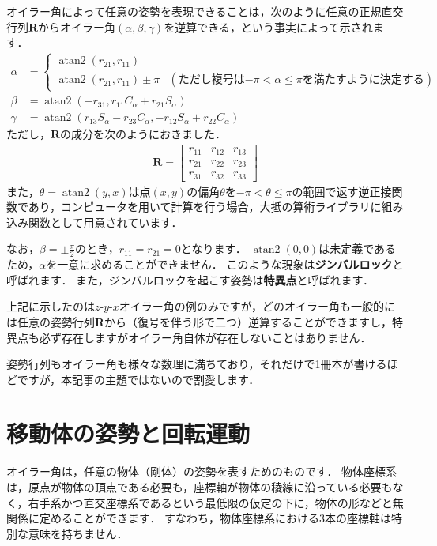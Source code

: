 ﻿\documentclass[a4paper]{jsarticle}
\begin{document}
オイラー角によって任意の姿勢を表現できることは，次のように任意の正規直交行列$\boldsymbol{R}$からオイラー角$(\alpha,\beta,\gamma)$を逆算できる，という事実によって示されます．
\begin{align*}
\alpha&=\begin{cases}
\mathop{\mathrm{atan2}}(r_{21},r_{11}) & \\
\mathop{\mathrm{atan2}}(r_{21},r_{11})\pm\pi & (\mbox{ただし複号は$-\pi<\alpha\leq\pi$を満たすように決定する})
\end{cases} \\
\beta&=\mathop{\mathrm{atan2}}(-r_{31},r_{11}C_{\alpha}+r_{21}S_{\alpha}) \\
\gamma&=\mathop{\mathrm{atan2}}(r_{13}S_{\alpha}-r_{23}C_{\alpha},-r_{12}S_{\alpha}+r_{22}C_{\alpha})
\end{align*}
ただし，$\boldsymbol{R}$の成分を次のようにおきました．
\begin{align*}
\boldsymbol{R}=\begin{bmatrix}
 r_{11} & r_{12} & r_{13} \\
 r_{21} & r_{22} & r_{23} \\
 r_{31} & r_{32} & r_{33}
\end{bmatrix}
\end{align*}
また，$\theta=\mathop{\mathrm{atan2}}(y,x)$は点$(x,y)$の偏角$\theta$を$-\pi<\theta\leq\pi$の範囲で返す逆正接関数であり，コンピュータを用いて計算を行う場合，大抵の算術ライブラリに組み込み関数として用意されています．

なお，$\beta=\pm\frac{\pi}{2}$のとき，$r_{11}=r_{21}=0$となります．
$\mathop{\mathrm{atan2}}(0,0)$は未定義であるため，$\alpha$を一意に求めることができません．
このような現象は{\bf ジンバルロック}と呼ばれます．
また，ジンバルロックを起こす姿勢は{\bf 特異点}と呼ばれます．

上記に示したのは$z$-$y$-$x$オイラー角の例のみですが，どのオイラー角も一般的には任意の姿勢行列$\boldsymbol{R}$から（復号を伴う形で二つ）逆算することができますし，特異点も必ず存在しますがオイラー角自体が存在しないことはありません．

姿勢行列もオイラー角も様々な数理に満ちており，それだけで1冊本が書けるほどですが，本記事の主題ではないので割愛します．



\section{移動体の姿勢と回転運動}

オイラー角は，任意の物体（剛体）の姿勢を表すためのものです．
物体座標系は，原点が物体の頂点である必要も，座標軸が物体の稜線に沿っている必要もなく，右手系かつ直交座標系であるという最低限の仮定の下に，物体の形などと無関係に定めることができます．
すなわち，物体座標系における3本の座標軸は特別な意味を持ちません．
\end{document}

